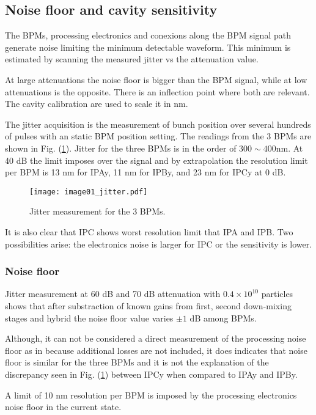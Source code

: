 \subsection{Noise floor and cavity sensitivity}
The BPMs, processing electronics and conexions along the BPM signal path generate noise limiting the minimum detectable waveform. This minimum is estimated by scanning the measured jitter vs the attenuation value.\par
At large attenuations the noise floor is bigger than the BPM signal, while at low attenuations is the opposite. There is an inflection point where both are relevant. The cavity calibration are used to scale it in nm.\par
The jitter acquisition is the measurement of bunch position over several hundreds of pulses with an static BPM position setting. 
The readings from the 3 BPMs are shown in Fig. (\ref{f:resojitter}). Jitter for the three BPMs is in the order of $300\sim400$nm. At 40 dB the limit imposes over the signal and by extrapolation the resolution limit per BPM is 13 nm for IPAy, 11 nm for IPBy, and 23 nm for IPCy at 0 dB.\par
\begin{figure}[!htb]
\centering%
 \texttt{[image: image01\_jitter.pdf]}\caption{Jitter measurement for the 3 BPMs.}\label{f:resojitter}
\end{figure}
It is also clear that IPC shows worst resolution limit that IPA and IPB. Two possibilities arise: the electronics noise is larger for IPC or the sensitivity is lower.\par 
\subsubsection{Noise floor}
Jitter measurement at 60 dB and 70 dB attenuation with $0.4\times10^{10}$ particles shows that after substraction of known gains from first, second down-mixing stages and hybrid the noise floor value varies $\pm1$ dB among BPMs.\par
Although, it can not be considered a direct measurement of the processing noise floor as in \cite{PhysRevSTAB.11.062801} because additional losses are not included, it does indicates that noise floor is similar for the three BPMs and it is not the explanation of the discrepancy seen in Fig. (\ref{f:resojitter}) between IPCy when compared to IPAy and IPBy.\par
A limit of 10 nm resolution per BPM is imposed by the processing electronics noise floor in the current state.\par

